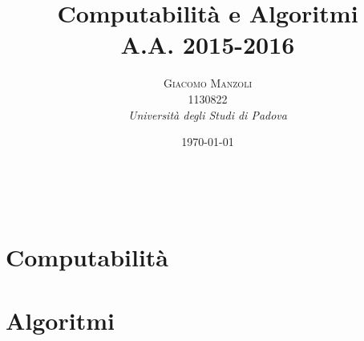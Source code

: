 \documentclass[a4paper, 11pt]{report} %
\title{\textbf{Computabilità e Algoritmi}\\ %
A.A. 2015-2016} %
\author{\textsc{Giacomo Manzoli}
\\ 1130822 %
\\{\textit{Università degli Studi di Padova}}} %
\date{\today} %
\makeatletter
\renewcommand{\maketitle}{ %
\begin{flushright} %
{\LARGE\@title} %

\vspace{50pt} %

{\large\@author} %
\\\@date %

\vspace{100pt} %
\end{flushright}
}
\makeatother
\begin{document}
\maketitle %



\clearpage
\tableofcontents
\listofalgorithms


\vspace{30pt} %

\clearpage

\part{Computabilità}























\part{Algoritmi}






















%
%
\end{document}
